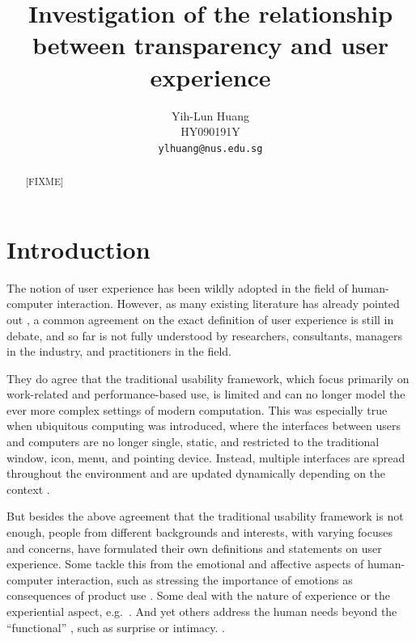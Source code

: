 \documentclass[a4paper,titlepage]{article}
\begin{document}
\title{Investigation of the relationship between transparency and user
  experience}
\author{Yih-Lun Huang\\
HY090191Y\\
\texttt{ylhuang@nus.edu.sg}}
\maketitle


\begin{abstract}
[FIXME]
\end{abstract}


\tableofcontents
\newpage


\section{Introduction}
\label{sec:introduction}
The notion of user experience has been wildly adopted in the field of
human-computer interaction. However, as many existing literature has
already pointed out \citep{ux:hassenzahl, ux:law}, a common agreement
on the exact definition of user experience is still in debate, and so
far is not fully understood by researchers, consultants, managers in
the industry, and practitioners in the field.

They do agree that the traditional usability framework, which focus
primarily on work-related and performance-based use, is limited and
can no longer model the ever more complex settings of modern
computation. This was especially true when ubiquitous computing was
introduced, where the interfaces between users and computers are no
longer single, static, and restricted to the traditional window, icon,
menu, and pointing device. Instead, multiple interfaces are spread
throughout the environment and are updated dynamically depending on
the context \citep{windows:bolter}.

But besides the above agreement that the traditional usability
framework is not enough, people from different backgrounds and
interests, with varying focuses and concerns, have formulated their
own definitions and statements on user experience. Some tackle this
from the emotional and affective aspects of human-computer
interaction, such as stressing the importance of emotions as
consequences of product use \citep{emotions:desmet}. Some deal with
the nature of experience or the experiential aspect,
e.g.\ \citet{experience:forlizzi}. And yet others address the human
needs beyond the ``functional'' \citep{emotional:norman}, such as
surprise or intimacy. \citep{alternatives:gaver}.
\end{document}
